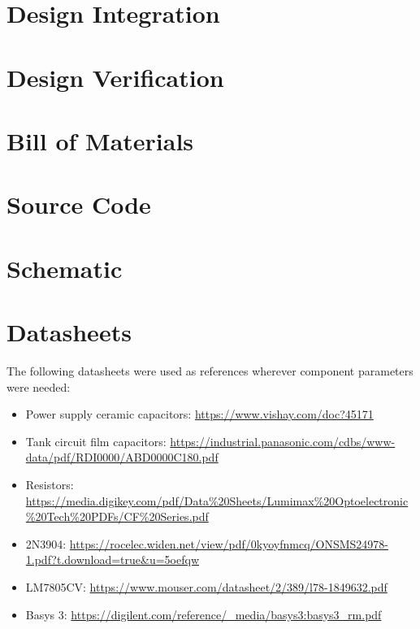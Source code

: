 \documentclass[12pt]{article}
\numberwithin{figure}{section}
\numberwithin{equation}{section}
\begin{document}
\section{Design Integration} 

\section{Design Verification} 


\section{Bill of Materials}

\section{Source Code}
\section{Schematic} 

\section{Datasheets}
The following datasheets were used as references wherever component parameters were needed: 

\begin{itemize} 
    \item Power supply ceramic capacitors: \url{https://www.vishay.com/doc?45171} 
    \item Tank circuit film capacitors: \url{https://industrial.panasonic.com/cdbs/www-data/pdf/RDI0000/ABD0000C180.pdf}
    \item Resistors: \url{https://media.digikey.com/pdf/Data%20Sheets/Lumimax%20Optoelectronic%20Tech%20PDFs/CF%20Series.pdf}
    \item 2N3904: \url{https://rocelec.widen.net/view/pdf/0kyoyfnmcq/ONSMS24978-1.pdf?t.download=true&u=5oefqw} 
    \item LM7805CV: \url{https://www.mouser.com/datasheet/2/389/l78-1849632.pdf}
    \item Basys 3: \url{https://digilent.com/reference/_media/basys3:basys3_rm.pdf}
\end{itemize}
\end{document}
